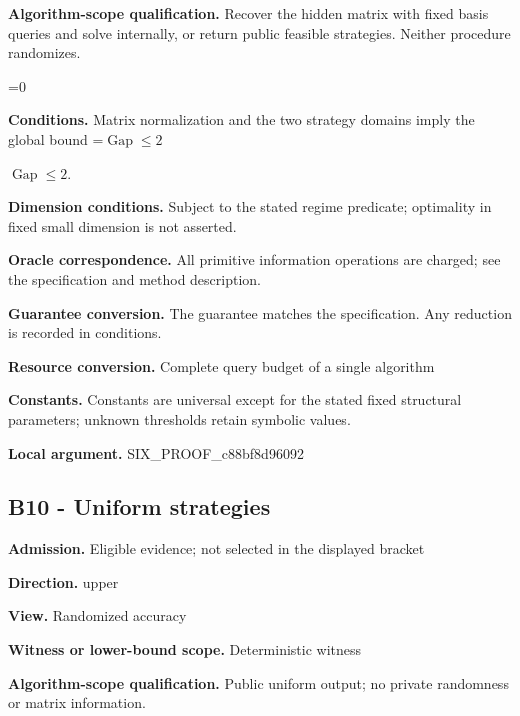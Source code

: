\documentclass[10pt,a4paper]{article}
\newcommand{\AtlasMath}[1]{\par\begingroup\centering\setbox0=\hbox{$\displaystyle #1$}\ifdim\wd0>1.4\linewidth\typeout{ATLAS WIDE FORMULA: \the\wd0}\fi\ifdim\wd0>\linewidth\resizebox{\linewidth}{!}{\box0}\else\box0\fi\par\endgroup}
\newcommand{\AtlasInlineMath}[1]{\begingroup\setbox0=\hbox{$#1$}\ifdim\wd0>.4\linewidth\endgroup\AtlasMath{#1}\else\endgroup$#1$\fi}
\begin{document}
\textbf{Algorithm-scope qualification.} Recover the hidden matrix with fixed basis queries and solve internally, or return public feasible strategies. Neither procedure randomizes.



\AtlasMath{0}


\textbf{Conditions.} Matrix normalization and the two strategy domains imply the global bound \AtlasInlineMath{\operatorname{Gap}\le2}.



\textbf{Dimension conditions.} Subject to the stated regime predicate; optimality in fixed small dimension is not asserted.



\textbf{Oracle correspondence.} All primitive information operations are charged; see the specification and method description.



\textbf{Guarantee conversion.} The guarantee matches the specification. Any reduction is recorded in conditions.



\textbf{Resource conversion.} Complete query budget of a single algorithm



\textbf{Constants.} Constants are universal except for the stated fixed structural parameters; unknown thresholds retain symbolic values.



\textbf{Local argument.} SIX\_PROOF\_c88bf8d96092



\subsection{B10 - Uniform strategies}


\textbf{Admission.} Eligible evidence; not selected in the displayed bracket



\textbf{Direction.} upper



\textbf{View.} Randomized accuracy



\textbf{Witness or lower-bound scope.} Deterministic witness



\textbf{Algorithm-scope qualification.} Public uniform output; no private randomness or matrix information.
\end{document}
